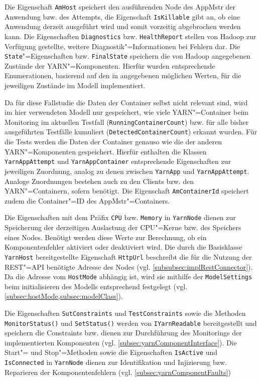 Die Eigenschaft \texttt{AmHost} speichert den ausführenden Node des \gls{AppMstr} der Anwendung bzw. des Attempts, die Eigenschaft \texttt{IsKillable} gibt an, ob eine Anwendung derzeit ausgeführt wird und somit vorzeitig abgebrochen werden kann.
Die Eigenschaften \texttt{Diagnostics} bzw. \texttt{HealthReport} stellen von Hadoop zur Verfügung gestellte, weitere Diagnostik"=Informationen bei Fehlern dar.
Die \texttt{State}"=Eigenschaften bzw. \texttt{FinalState} speichern die von Hadoop angegebenen Zustände der YARN"=Komponenten.
Hierfür wurden entsprechende Enumerationen, basierend auf den in \cite{HadoopRmApi271} angegebenen möglichen Werten, für die jeweiligen Zustände im Modell implementiert.

Da für diese Fallstudie die Daten der Container selbst nicht relevant sind, wird im hier verwendeten Modell nur gespeichert, wie viele YARN"=Container beim Monitoring im aktuellen Testfall (\texttt{RunningContainerCount}) bzw. für alle bisher ausgeführten Testfälle kumuliert (\texttt{DetectedContainerCount}) erkannt wurden.
Für die Tests \cite{Eberhardinger2018} werden die Daten der Container genauso wie die der anderen YARN"=Komponenten gespeichert.
Hierfür enthalten die Klassen \texttt{YarnAppAttempt} und \texttt{YarnAppContainer} entsprechende Eigenschaften zur jeweiligen Zuordnung, analog zu denen zwischen \texttt{YarnApp} und \texttt{YarnAppAttempt}.
Analoge Zuordnungen bestehen auch zu den Clients bzw. den YARN"=Containern, sofern benötigt.
Die Eigenschaft \texttt{AmContainerId} speichert zudem die Container"=ID des \gls{AppMstr}"=Containers.

Die Eigenschaften mit dem Präfix \texttt{CPU} bzw. \texttt{Memory} in \texttt{YarnNode} dienen zur Speicherung der derzeitigen Auslastung der CPU"=Kerne bzw. des Speichers eines Nodes.
Benötigt werden diese Werte zur Berechnung, ob ein Komponentenfehler aktiviert oder deaktiviert wird.
Die durch die Basisklasse \texttt{YarnHost} bereitgestellte Eigenschaft \texttt{HttpUrl} beschreibt die für die Nutzung der REST"=API benötigte Adresse des Nodes (vgl. \cref{subsubsec:implRestConnector}).
Da die Adresse vom \texttt{HostMode} abhängig ist, wird sie mithilfe der \texttt{ModelSettings} beim initialisieren des Modells entsprechend festgelegt (vgl. \cref{subsec:hostMode,subsec:modelClass}).

Die Eigenschaften \texttt{SutConstraints} und \texttt{TestConstraints} sowie die Methoden \texttt{MonitorStatus()} und \texttt{SetStatus()} werden von \texttt{IYarnReadable} bereitgestellt und speichern die Constraints bzw. dienen zur Durchführung des Monitorings der implementierten Komponenten (vgl. \cref{subsec:yarnComponentInterface}).
Die Start"= und Stop"=Methoden sowie die Eigenschaften \texttt{IsActive} und \texttt{IsConnected} in \texttt{YarnNode} dienen zur Identifikation und Injizierung bzw. Reparieren der Komponentenfehlern (vgl. \cref{subsec:yarnComponentFaults})

